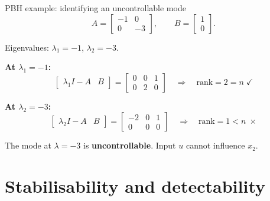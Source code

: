 \documentclass[aspectratio=169,10pt]{beamer}
\begin{document}
\begin{frame}{PBH example: identifying an uncontrollable mode}
\[
A=\begin{bmatrix}-1&0\\0&-3\end{bmatrix},
\qquad
B=\begin{bmatrix}1\\0\end{bmatrix}.
\]

Eigenvalues: $\lambda_1=-1$, $\lambda_2=-3$.

\textbf{At $\lambda_1=-1$:}
\[
\begin{bmatrix}\lambda_1 I-A & B\end{bmatrix}
=\begin{bmatrix}0&0&1\\0&2&0\end{bmatrix}
\quad\Rightarrow\quad \mathrm{rank}=2=n \;\checkmark
\]

\textbf{At $\lambda_2=-3$:}
\[
\begin{bmatrix}\lambda_2 I-A & B\end{bmatrix}
=\begin{bmatrix}-2&0&1\\0&0&0\end{bmatrix}
\quad\Rightarrow\quad \mathrm{rank}=1<n \;\times
\]

The mode at $\lambda=-3$ is \textbf{uncontrollable}.  Input $u$ cannot
influence $x_2$.
\end{frame}

\section{Stabilisability and detectability}
\end{document}
